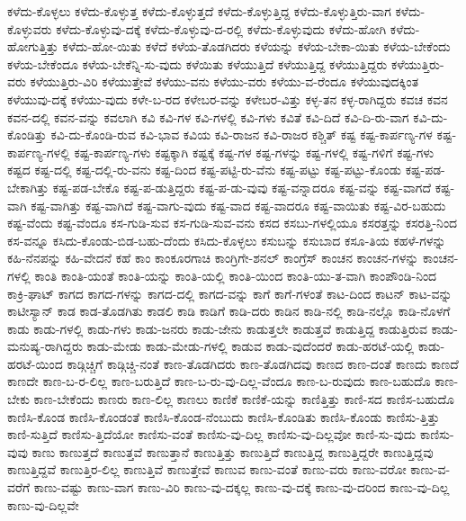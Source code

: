 {ಕಳೆದು-ಕೊಳ್ಳಲು
ಕಳೆದು-ಕೊಳ್ಳುತ್ತ
ಕಳೆದು-ಕೊಳ್ಳುತ್ತದೆ
ಕಳೆದು-ಕೊಳ್ಳುತ್ತಿದ್ದ
ಕಳೆದು-ಕೊಳ್ಳುತ್ತಿರು-ವಾಗ
ಕಳೆದು-ಕೊಳ್ಳುವರು
ಕಳೆದು-ಕೊಳ್ಳುವು-ದಕ್ಕೆ
ಕಳೆದು-ಕೊಳ್ಳುವು-ದ-ರಲ್ಲಿ
ಕಳೆದು-ಕೊಳ್ಳುವುದು
ಕಳೆದು-ಹೋಗಿ
ಕಳೆದು-ಹೋಗುತ್ತಿತ್ತು
ಕಳೆದು-ಹೋ-ಯಿತು
ಕಳೆದೆ
ಕಳೆಯ-ತೊಡಗಿದರು
ಕಳೆಯನ್ನು
ಕಳೆಯ-ಬೇಕಾ-ಯಿತು
ಕಳೆಯ-ಬೇಕೆಂದು
ಕಳೆಯ-ಬೇಕೆಂದೂ
ಕಳೆಯ-ಬೇಕೆನ್ನಿ-ಸು-ವುದು
ಕಳೆಯಿತು
ಕಳೆಯುತ್ತಿದೆ
ಕಳೆಯುತ್ತಿದ್ದ
ಕಳೆಯುತ್ತಿದ್ದರು
ಕಳೆಯುತ್ತಿರು-ವರು
ಕಳೆಯುತ್ತಿರು-ವಿರಿ
ಕಳೆಯುತ್ತೇವೆ
ಕಳೆಯು-ವನು
ಕಳೆಯು-ವರು
ಕಳೆಯು-ವ-ರೆಂದೂ
ಕಳೆಯುವುದಕ್ಕಿಂತ
ಕಳೆಯುವು-ದಕ್ಕೆ
ಕಳೆಯು-ವುದು
ಕಳೇ-ಬ-ರದ
ಕಳೇಬರ-ವನ್ನು
ಕಳೇಬರ-ವಿತ್ತು
ಕಳ್ಳ-ತನ
ಕಳ್ಳ-ರಾಗಿದ್ದರು
ಕವಚ
ಕವನ
ಕವನ-ದಲ್ಲಿ
ಕವನ-ವನ್ನು
ಕವಲಾಗಿ
ಕವಿ
ಕವಿ-ಗಳ
ಕವಿ-ಗಳಲ್ಲಿ
ಕವಿ-ಗಳು
ಕವಿತೆ
ಕವಿ-ದಿದೆ
ಕವಿ-ದಿ-ರು-ವಾಗ
ಕವಿ-ದು-ಕೊಂಡಿತ್ತು
ಕವಿ-ದು-ಕೊಂಡಿ-ರುವ
ಕವಿ-ಭಾವ
ಕವಿಯ
ಕವಿ-ರಾಜನ
ಕವಿ-ರಾಜರ
ಕಶ್ಚಿತ್
ಕಷ್ಟ
ಕಷ್ಟ-ಕಾರ್ಪಣ್ಯ-ಗಳ
ಕಷ್ಟ-ಕಾರ್ಪಣ್ಯ-ಗಳಲ್ಲಿ
ಕಷ್ಟ-ಕಾರ್ಪಣ್ಯ-ಗಳು
ಕಷ್ಟಕ್ಕಾಗಿ
ಕಷ್ಟಕ್ಕೆ
ಕಷ್ಟ-ಗಳ
ಕಷ್ಟ-ಗಳನ್ನು
ಕಷ್ಟ-ಗಳಲ್ಲಿ
ಕಷ್ಟ-ಗಳಿಗೆ
ಕಷ್ಟ-ಗಳು
ಕಷ್ಟದ
ಕಷ್ಟ-ದಲ್ಲಿ
ಕಷ್ಟ-ದಲ್ಲಿ-ರು-ವನು
ಕಷ್ಟ-ದಿಂದ
ಕಷ್ಟ-ಪಟ್ಟಿ-ರು-ವೆನು
ಕಷ್ಟ-ಪಟ್ಟು
ಕಷ್ಟ-ಪಟ್ಟು-ಕೊಂಡು
ಕಷ್ಟ-ಪಡ-ಬೇಕಾಗಿತ್ತು
ಕಷ್ಟ-ಪಡ-ಬೇಕೊ
ಕಷ್ಟ-ಪ-ಡುತ್ತಿದ್ದರು
ಕಷ್ಟ-ಪ-ಡು-ವುವು
ಕಷ್ಟ-ವನ್ನಾದರೂ
ಕಷ್ಟ-ವನ್ನು
ಕಷ್ಟ-ವಾಗದೆ
ಕಷ್ಟ-ವಾಗಿ
ಕಷ್ಟ-ವಾಗಿತ್ತು
ಕಷ್ಟ-ವಾಗಿದೆ
ಕಷ್ಟ-ವಾಗು-ವುದು
ಕಷ್ಟ-ವಾದ
ಕಷ್ಟ-ವಾದರೂ
ಕಷ್ಟ-ವಾಯಿತು
ಕಷ್ಟ-ವಿರ-ಬಹುದು
ಕಷ್ಟ-ವೆಂದು
ಕಷ್ಟ-ವೆಂದೂ
ಕಸ-ಗುಡಿ-ಸುವ
ಕಸ-ಗುಡಿ-ಸುವ-ವನು
ಕಸದ
ಕಸಬು-ಗಳಲ್ಲಿಯೂ
ಕಸರತ್ತನ್ನು
ಕಸರತ್ತಿ-ನಿಂದ
ಕಸ-ವನ್ನೂ
ಕಸಿದು-ಕೊಂಡು-ಬಿಡ-ಬಹು-ದೆಂದು
ಕಸಿದು-ಕೊಳ್ಳಲು
ಕಸುಬನ್ನು
ಕಸುಬಾದ
ಕಸೂ-ತಿಯ
ಕಹಳೆ-ಗಳನ್ನು
ಕಹಿ-ನೆನಪನ್ನು
ಕಹಿ-ವೇದನೆ
ಕಹೆ
ಕಾಂ
ಕಾಂಕೂರಗಾಚಿ
ಕಾಂಗ್ರಿಗೇ-ಶನಲ್
ಕಾಂಗ್ರೆಸ್
ಕಾಂಚನ
ಕಾಂಚನ-ಗಳನ್ನು
ಕಾಂಚನ-ಗಳಲ್ಲಿ
ಕಾಂತಿ
ಕಾಂತಿ-ಯಂತೆ
ಕಾಂತಿ-ಯನ್ನು
ಕಾಂತಿ-ಯಲ್ಲಿ
ಕಾಂತಿ-ಯಿಂದ
ಕಾಂತಿ-ಯು-ತ-ವಾಗಿ
ಕಾಂಪೌಂಡಿ-ನಿಂದ
ಕಾಕ್ರಿ-ಘಾಟ್
ಕಾಗದ
ಕಾಗದ-ಗಳನ್ನು
ಕಾಗದ-ದಲ್ಲಿ
ಕಾಗದ-ವನ್ನು
ಕಾಗೆ
ಕಾಗೆ-ಗಳಂತೆ
ಕಾಟ-ದಿಂದ
ಕಾಟನ್
ಕಾಟ-ವನ್ನು
ಕಾಟೀಸ್ಯಾನ್
ಕಾಡ
ಕಾಡ-ತೊಡಗಿತು
ಕಾಡಲಿ
ಕಾಡಿ
ಕಾಡಿಗೆ
ಕಾಡಿ-ದರು
ಕಾಡಿನ
ಕಾಡಿ-ನಲ್ಲಿ
ಕಾಡಿ-ನಲ್ಲೊ
ಕಾಡಿ-ನೊಳಗೆ
ಕಾಡು
ಕಾಡು-ಗಳಲ್ಲಿ
ಕಾಡು-ಗಳು
ಕಾಡು-ಜನರು
ಕಾಡು-ಜೇನು
ಕಾಡುತ್ತಲೇ
ಕಾಡುತ್ತವೆ
ಕಾಡುತ್ತಿದ್ದ
ಕಾಡುತ್ತಿರುವ
ಕಾಡು-ಮನುಷ್ಯ-ರಾಗಿದ್ದರು
ಕಾಡು-ಮೇಡು
ಕಾಡು-ಮೇಡು-ಗಳಲ್ಲಿ
ಕಾಡುವ
ಕಾಡು-ವುದೆಂದರೆ
ಕಾಡು-ಹರಟೆ-ಯಲ್ಲಿ
ಕಾಡು-ಹರಟೆ-ಯಿಂದ
ಕಾಡ್ಗಿಚ್ಚಿಗೆ
ಕಾಡ್ಗಿಚ್ಚಿ-ನಂತೆ
ಕಾಣ-ತೊಡಗಿದರು
ಕಾಣ-ತೊಡಗಿದವು
ಕಾಣದ
ಕಾಣ-ದಂತೆ
ಕಾಣದು
ಕಾಣದೆ
ಕಾಣದೇ
ಕಾಣ-ಬ-ರ-ಲಿಲ್ಲ
ಕಾಣ-ಬರುತ್ತಿದೆ
ಕಾಣ-ಬ-ರು-ವು-ದಿಲ್ಲ-ವೆಂದೂ
ಕಾಣ-ಬ-ರುವುದು
ಕಾಣ-ಬಹುದೊ
ಕಾಣ-ಬೇಕು
ಕಾಣ-ಬೇಕೆಂದು
ಕಾಣರು
ಕಾಣ-ಲಿಲ್ಲ
ಕಾಣಲು
ಕಾಣಿಕೆ
ಕಾಣಿಕೆ-ಯನ್ನು
ಕಾಣಿತ್ತಿತ್ತು
ಕಾಣಿ-ಸದ
ಕಾಣಿಸ-ಬಹುದೊ
ಕಾಣಿಸಿ-ಕೊಂಡ
ಕಾಣಿಸಿ-ಕೊಂಡಂತೆ
ಕಾಣಿಸಿ-ಕೊಂಡ-ನೆಂಬುದು
ಕಾಣಿಸಿ-ಕೊಂಡಿತು
ಕಾಣಿಸಿ-ಕೊಂಡು
ಕಾಣಿಸು-ತ್ತಿತ್ತು
ಕಾಣಿ-ಸುತ್ತಿದೆ
ಕಾಣಿಸು-ತ್ತಿದೆಯೋ
ಕಾಣಿಸು-ವಂತೆ
ಕಾಣಿಸು-ವು-ದಿಲ್ಲ
ಕಾಣಿಸು-ವು-ದಿಲ್ಲವೋ
ಕಾಣಿ-ಸು-ವುದು
ಕಾಣಿಸು-ವುವು
ಕಾಣು
ಕಾಣುತ್ತದೆ
ಕಾಣುತ್ತವೆ
ಕಾಣುತ್ತಾನೆ
ಕಾಣುತ್ತಿತ್ತು
ಕಾಣುತ್ತಿದೆ
ಕಾಣುತ್ತಿದ್ದ
ಕಾಣುತ್ತಿದ್ದರೇ
ಕಾಣುತ್ತಿದ್ದವು
ಕಾಣುತ್ತಿದ್ದವೆ
ಕಾಣುತ್ತಿರ-ಲಿಲ್ಲ
ಕಾಣುತ್ತಿವೆ
ಕಾಣುತ್ತೇವೆ
ಕಾಣುವ
ಕಾಣು-ವಂತೆ
ಕಾಣು-ವರು
ಕಾಣು-ವರೋ
ಕಾಣು-ವ-ವರೆಗೆ
ಕಾಣು-ವಷ್ಟು
ಕಾಣು-ವಾಗ
ಕಾಣು-ವಿರಿ
ಕಾಣು-ವು-ದಕ್ಕಲ್ಲ
ಕಾಣು-ವು-ದಕ್ಕೆ
ಕಾಣು-ವು-ದರಿಂದ
ಕಾಣು-ವು-ದಿಲ್ಲ
ಕಾಣು-ವು-ದಿಲ್ಲವೇ
}
